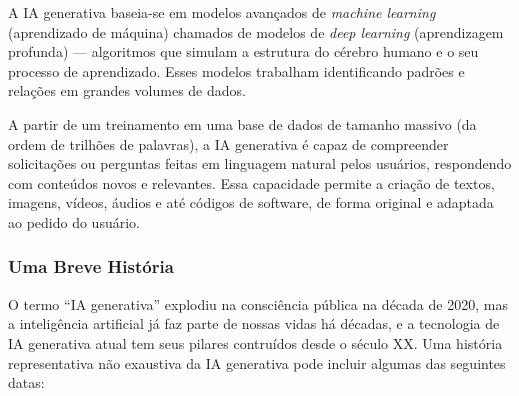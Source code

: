 \documentclass[a4paper, 12pt]{article}
\begin{document}
    A IA generativa baseia-se em modelos avançados de \textit{machine learning} (aprendizado de máquina) chamados de modelos de \textit{deep learning} (aprendizagem profunda) — algoritmos que simulam a estrutura do cérebro humano e o seu processo de aprendizado. Esses modelos trabalham identificando padrões e relações em grandes volumes de dados.

    A partir de um treinamento em uma base de dados de tamanho massivo (da ordem de trilhões de palavras), a IA generativa é capaz de compreender solicitações ou perguntas feitas em linguagem natural pelos usuários, respondendo com conteúdos novos e relevantes. Essa capacidade permite a criação de textos, imagens, vídeos, áudios e até códigos de software, de forma original e adaptada ao pedido do usuário.


    \subsubsection{Uma Breve História}

    O termo ``IA generativa'' explodiu na consciência pública na década de 2020, mas a inteligência artificial já faz parte de nossas vidas há décadas, e a tecnologia de IA generativa atual tem seus pilares contruídos desde o século XX. Uma história representativa não exaustiva da IA generativa pode incluir algumas das seguintes datas:
\end{document}
